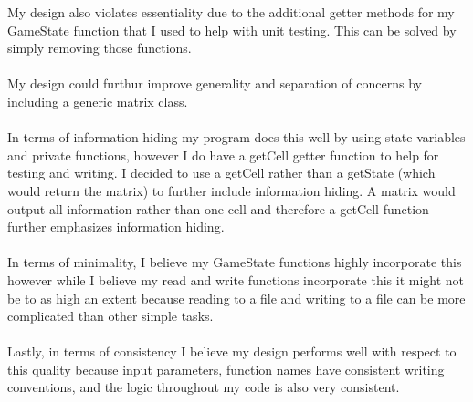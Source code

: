 \documentclass[12pt]{article}
\begin{document}
  My design also violates essentiality due to the additional getter methods for
  my GameState function that I used to help with unit testing. This can be solved by simply removing
  those functions.\\\\

  My design could furthur improve generality and separation of concerns by including
  a generic matrix class.\\\\

  In terms of information hiding my program does this well by using state variables and private functions,
  however I do have a getCell getter function to help for testing and writing. I decided to use
  a getCell rather than a getState (which would return the matrix) to further include information hiding.
  A matrix would output all information rather than one cell and therefore a getCell function
  further emphasizes information hiding.\\\\

  In terms of minimality, I believe my GameState functions highly incorporate this however
  while I believe my read and write functions incorporate this it might not be to as high an
  extent because reading to a file and writing to a file can be more complicated than other
  simple tasks.\\\\

  Lastly, in terms of consistency I believe my design performs well with respect to this quality
  because input parameters, function names have consistent writing conventions, and the logic
  throughout my code is also very consistent.\\\\
\end{document}
